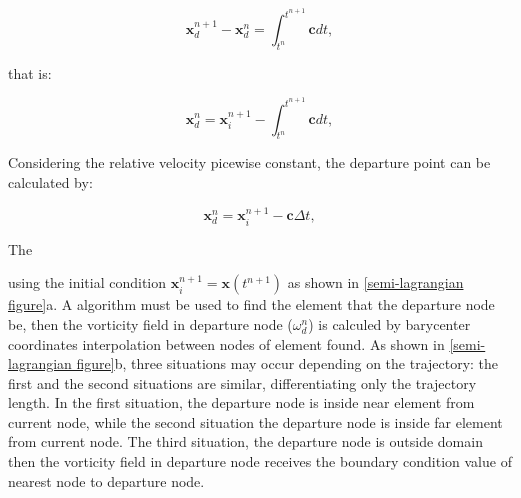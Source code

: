 \begin{equation} 
\textbf{x}_{d}^{n+1} - \textbf{x}_{d}^{n} 
= \int_{t^{n}}^{t^{n+1}} \textbf{c} dt, 
\end{equation}

\medskip
\noindent
that is:

\begin{equation} 
\textbf{x}_{d}^{n} = \textbf{x}_{i}^{n+1} 
- \int_{t^{n}}^{t^{n+1}} \textbf{c}  dt, 
\end{equation}


\medskip
\noindent
Considering the relative velocity picewise constant,
the departure point can be calculated by:

\begin{equation} 
\textbf{x}_{d}^{n} = \textbf{x}_{i}^{n+1} 
- \textbf{c} \Delta t, 
\end{equation}


The

using the initial condition $\mathbf{x}_{i}^{n+1} = \mathbf{x}(t^{n+1})$
 as shown in \ref{semi-lagrangian figure}a. 
A algorithm must be used to find the element that the departure node be, 
then the vorticity field in departure node ($\omega_{d}^{n}$) is 
calculed by barycenter coordinates interpolation between nodes of 
element found.
As shown in \ref{semi-lagrangian figure}b, three situations may 
occur depending on the trajectory: the first and the second 
situations are similar, differentiating only the trajectory length. 
In the first situation, the departure node is inside near 
element from current node, while the second situation 
the departure node is inside far element from current node. 
The third situation, the departure node is outside domain 
then the vorticity field in departure node receives the 
boundary condition value of nearest node to departure node.

